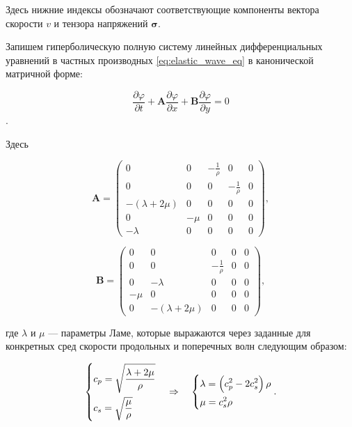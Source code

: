 \noindent Здесь нижние индексы обозначают соответствующие компоненты вектора скорости $v$ и тензора напряжений $\pmb{\sigma}$.

Запишем гиперболическую полную систему линейных дифференциальных уравнений в частных производных \eqref{eq:elastic_wave_eq} в канонической матричной форме:

\begin{equation}
    \dfrac{\partial \varphi}{\partial t} + 
    \pmb{A} \dfrac{\partial \varphi}{\partial x} + 
    \pmb{B} \dfrac{\partial \varphi}{\partial y} = 0
    \label{eq:gcm_system}
\end{equation}.

\noindent Здесь

\begin{equation*}
    \pmb{A} = \begin{pmatrix}
        0 & 0 & -\frac{1}{\rho} & 0 & 0 \\
        0 & 0 & 0 & -\frac{1}{\rho} & 0 \\
        -(\lambda+2\mu) & 0 & 0 & 0 & 0 \\
        0 & -\mu & 0 & 0 & 0 \\
        -\lambda & 0 & 0 & 0 & 0
    \end{pmatrix},
\end{equation*}

\begin{equation*}
    \pmb{B} = \begin{pmatrix}
        0 & 0 & 0 & 0 & 0 \\
        0 & 0 & -\frac{1}{\rho} & 0 & 0 \\
        0 & -\lambda & 0 & 0 & 0 \\
        -\mu & 0 & 0 & 0 & 0 \\
        0 & -(\lambda+2\mu) & 0 & 0 & 0
    \end{pmatrix},
\end{equation*}

\noindent где $\lambda$ и $\mu$ --- параметры Ламе, которые выражаются через заданные для конкретных сред скорости продольных и поперечных волн следующим образом:

\begin{equation*}
    \begin{dcases}
        c_p = \sqrt{\dfrac{\lambda + 2\mu}{\rho}} \\
        c_s = \sqrt{\dfrac{\mu}{\rho}}
    \end{dcases}
    \quad \Rightarrow \quad
    \begin{dcases}
        \lambda = \left(c_p^2 - 2 c_s^2\right) \rho \\
        \mu = c_s^2 \rho 
    \end{dcases}
    .
\end{equation*}

